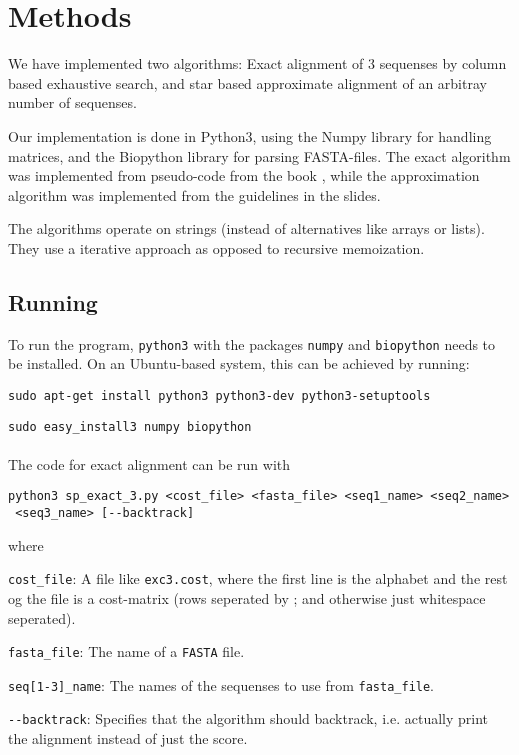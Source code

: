 \section{Methods}

We have implemented two algorithms: Exact alignment of 3 sequenses by
column based exhaustive search, and star based approximate alignment
of an arbitray number of sequenses.

Our implementation is done in Python3, using the Numpy library for
handling matrices, and the Biopython library for parsing FASTA-files.
The exact algorithm was implemented from pseudo-code from the book
\citep{Gusfield}, while the approximation algorithm was implemented
from the guidelines in the slides.

The algorithms operate on strings (instead of alternatives like arrays
or lists). They use a iterative approach as opposed to recursive
memoization.

\subsection{Running}

To run the program, \verb|python3| with the packages \verb|numpy| and
\verb|biopython| needs to be installed. On an Ubuntu-based system, this can
be achieved by running:

\verb|sudo apt-get install python3 python3-dev python3-setuptools|

\verb|sudo easy_install3 numpy biopython|

\paragraph{}
The code for exact alignment can be run with

\begin{verbatim}
python3 sp_exact_3.py <cost_file> <fasta_file> <seq1_name> <seq2_name>
 <seq3_name> [--backtrack]
\end{verbatim}

where

\begin{description}
\item{\verb|cost_file|:} A file like \verb|exc3.cost|, where the
  first line is the alphabet and the rest og the file is a cost-matrix
  (rows seperated by ; and otherwise just whitespace seperated).
\item{\verb|fasta_file|:} The name of a \verb|FASTA| file.
\item{\verb|seq[1-3]_name|:} The names of the sequenses to use from
  \verb|fasta_file|.
\item{\verb|--backtrack|:} Specifies that the algorithm should
  backtrack, i.e. actually print the alignment instead of just the
  score.
\end{description}

